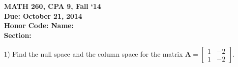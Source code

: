 \documentclass{article}
\begin{document}
\begin{flushleft}
	\bfseries{MATH 260, CPA 9, Fall `14}\\
	\bfseries{Due: October 21, 2014}\\
	\bfseries{Honor Code:} \hspace{3.5in}\bfseries{Name:}\\
	\hspace{4.37in}\bfseries{Section:}
\end{flushleft}
\vspace{.25in}
\begin{flushleft}

1) Find the null space and the column space for the matrix $\textbf{A} = \begin{bmatrix} 1&-2 \\ 1&-2 \end{bmatrix}$.


\end{flushleft}
\end{document}
